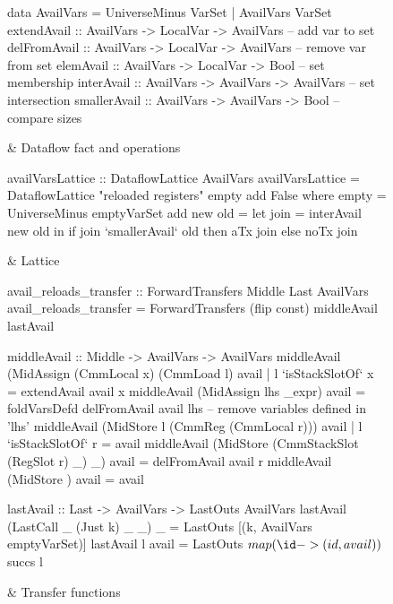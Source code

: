 \documentclass[blockstyle,preprint,nocopyrightspace]{sigplanconf}
\begin{document}
\begin{figure*}
\begin{codetable}
\T\begin{code}
data AvailVars = UniverseMinus VarSet
               | AvailVars     VarSet
extendAvail  :: AvailVars -> LocalVar  -> AvailVars  -- add var to set
delFromAvail :: AvailVars -> LocalVar  -> AvailVars  -- remove var from set
elemAvail    :: AvailVars -> LocalVar  -> Bool       -- set membership
interAvail   :: AvailVars -> AvailVars -> AvailVars  -- set intersection
smallerAvail :: AvailVars -> AvailVars -> Bool       -- compare sizes
\end{code}\B
& Dataflow fact and operations\\
\hline

\T\begin{code}
availVarsLattice :: DataflowLattice AvailVars
availVarsLattice = DataflowLattice "reloaded registers" empty add False
    where empty = UniverseMinus emptyVarSet
          add new old = let join = interAvail new old in
                        if join `smallerAvail` old then aTx join else noTx join
\end{code}\B
& Lattice\\
\hline

\T\begin{code}
avail_reloads_transfer :: ForwardTransfers Middle Last AvailVars
avail_reloads_transfer = ForwardTransfers (flip const) middleAvail lastAvail

middleAvail :: Middle -> AvailVars -> AvailVars
middleAvail (MidAssign (CmmLocal x) (CmmLoad l) avail
                 | l `isStackSlotOf` x = extendAvail avail x
middleAvail (MidAssign lhs _expr) avail = 
  foldVarsDefd delFromAvail avail lhs  -- remove variables defined in 'lhs'
middleAvail (MidStore l (CmmReg (CmmLocal r))) avail
                 | l `isStackSlotOf` r = avail
middleAvail (MidStore (CmmStackSlot (RegSlot r) _) _) avail = delFromAvail avail r
middleAvail (MidStore {}) avail = avail

lastAvail :: Last -> AvailVars -> LastOuts AvailVars
lastAvail (LastCall _ (Just k) _ _) _ = LastOuts [(k, AvailVars emptyVarSet)]
lastAvail l avail = LastOuts $ map (\id -> (id, avail)) $ succs l
\end{code}\B
& Transfer \mbox{functions}\\
\hline


\end{codetable}
\end{figure*}
\end{document}
